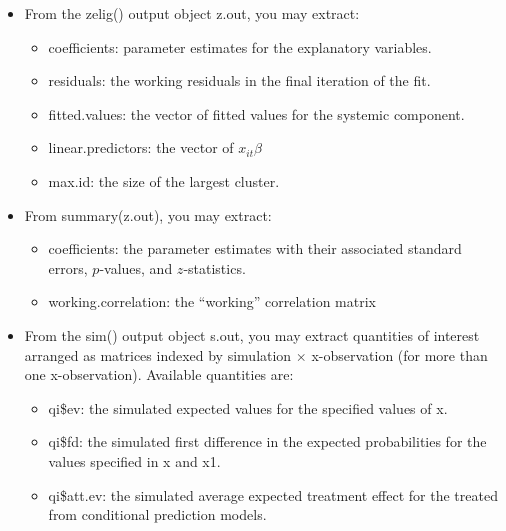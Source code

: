 \documentclass[letterpaper,10pt,english]{sphinxmanual}
\begin{document}
\begin{itemize}
\item {} 
From the zelig() output object z.out, you may extract:
\begin{itemize}
\item {} 
coefficients: parameter estimates for the explanatory variables.

\item {} 
residuals: the working residuals in the final iteration of the
fit.

\item {} 
fitted.values: the vector of fitted values for the systemic
component.

\item {} 
linear.predictors: the vector of \(x_{it}\beta\)

\item {} 
max.id: the size of the largest cluster.

\end{itemize}

\item {} 
From summary(z.out), you may extract:
\begin{itemize}
\item {} 
coefficients: the parameter estimates with their associated
standard errors, \(p\)-values, and \(z\)-statistics.

\item {} 
working.correlation: the “working” correlation matrix

\end{itemize}

\item {} 
From the sim() output object s.out, you may extract quantities of
interest arranged as matrices indexed by simulation \(\times\)
x-observation (for more than one x-observation). Available quantities
are:
\begin{itemize}
\item {} 
qi\$ev: the simulated expected values for the specified values of
x.

\item {} 
qi\$fd: the simulated first difference in the expected
probabilities for the values specified in x and x1.

\item {} 
qi\$att.ev: the simulated average expected treatment effect for the
treated from conditional prediction models.

\end{itemize}

\end{itemize}
\end{document}
